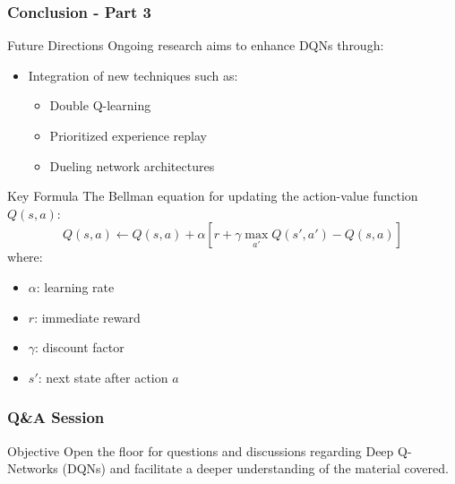\documentclass[aspectratio=169]{beamer}
\begin{document}
\begin{frame}[fragile]
    \frametitle{Conclusion - Part 3}
    \begin{block}{Future Directions}
        Ongoing research aims to enhance DQNs through:
        \begin{itemize}
            \item Integration of new techniques such as:
                \begin{itemize}
                    \item Double Q-learning
                    \item Prioritized experience replay
                    \item Dueling network architectures
                \end{itemize}
        \end{itemize}
    \end{block}

    \begin{block}{Key Formula}
        The Bellman equation for updating the action-value function \( Q(s, a) \):
        \begin{equation}
            Q(s, a) \leftarrow Q(s, a) + \alpha \left[ r + \gamma \max_{a'} Q(s', a') - Q(s, a) \right]
        \end{equation}
        where:
        \begin{itemize}
            \item \( \alpha \): learning rate
            \item \( r \): immediate reward
            \item \( \gamma \): discount factor
            \item \( s' \): next state after action \( a \)
        \end{itemize}
    \end{block}
\end{frame}

\begin{frame}[fragile]
    \frametitle{Q\&A Session}
    \begin{block}{Objective}
        Open the floor for questions and discussions regarding Deep Q-Networks (DQNs) and facilitate a deeper understanding of the material covered.
    \end{block}
\end{frame}
\end{document}
